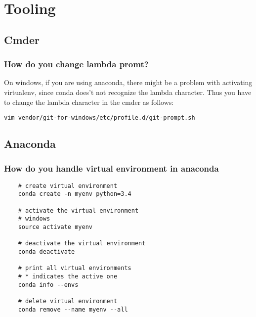 \chapter{   Tooling}
\graphicspath{{./images/tooling/}}

\section{Cmder}

\subsection{How do you change lambda promt?}
On windows, if you are using anaconda, there might be a problem with activating virtualenv, since conda does't not recognize the lambda character. Thus you have to change the lambda character in the cmder as follows:

\vspace{4mm}

\begin{lstlisting}
vim vendor/git-for-windows/etc/profile.d/git-prompt.sh
\end{lstlisting}




\section{Anaconda}

\subsection{How do you handle virtual environment in anaconda}
\begin{lstlisting}
    # create virtual environment
    conda create -n myenv python=3.4

    # activate the virtual environment
    # windows
    source activate myenv

    # deactivate the virtual environment
    conda deactivate

    # print all virtual environments
    # * indicates the active one
    conda info --envs

    # delete virtual environment
    conda remove --name myenv --all
\end{lstlisting}




